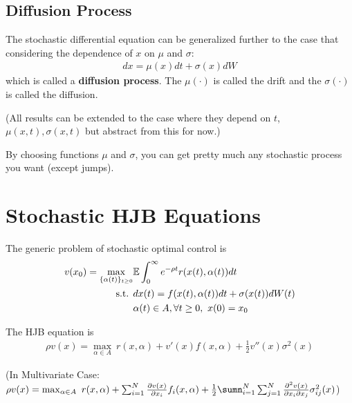 \documentclass[11pt]{elegantbook}
\begin{document}
\subsection{Diffusion Process}
\begin{definition}
    The stochastic differential equation can be generalized further to the case that considering the dependence of $x$ on $\mu$ and $\sigma$:
    \begin{equation}
        \begin{aligned}
            dx=\mu(x)dt+\sigma(x)dW
        \end{aligned}
        \nonumber
    \end{equation}
    which is called a \textbf{diffusion process}. The $\mu(\cdot)$ is called the drift and the $\sigma(\cdot)$ is called the diffusion.
\end{definition}
(All results can be extended to the case where they depend on $t$,
$\mu(x, t), \sigma(x, t)$ but abstract from this for now.)
\begin{note}
    By choosing functions $\mu$ and $\sigma$, you can get pretty much any stochastic process you want (except jumps).
\end{note}

\section{Stochastic HJB Equations}
The generic problem of stochastic optimal control is
\begin{equation}
    \begin{aligned}
        v(x_0)=\max_{\{\alpha(t)\}_{t\geq 0}}&\mathbb{E}\int_0^{\infty}e^{-\rho t}r(x(t),\alpha(t))dt\\
        \textnormal{s.t. }& dx(t)=f(x(t),\alpha(t))dt+\sigma(x(t))dW(t)\\
        & \alpha(t)\in A,\forall t\geq 0,\ x(0)=x_0
    \end{aligned}
    \nonumber
\end{equation}
\begin{proposition}
    The HJB equation is
    \begin{equation}
        \begin{aligned}
            \rho v(x) = \max_{\alpha\in A}\ r(x,\alpha) + v'(x)f(x,\alpha) + \frac{1}{2}v''(x)\sigma^2(x)
        \end{aligned}
        \nonumber
    \end{equation}
\end{proposition}
(In Multivariate Case: $\rho v(x) = \max_{\alpha\in A}\ r(x,\alpha) + \sum_{i=1}^N \frac{\partial v(x)}{\partial x_i} f_i(x,\alpha) + \frac{1}{2}\sumn_{i=1}^N\sum_{j=1}^N \frac{\partial^2 v(x)}{\partial x_i \partial x_j} \sigma_{ij}^2(x)$)
\end{document}
